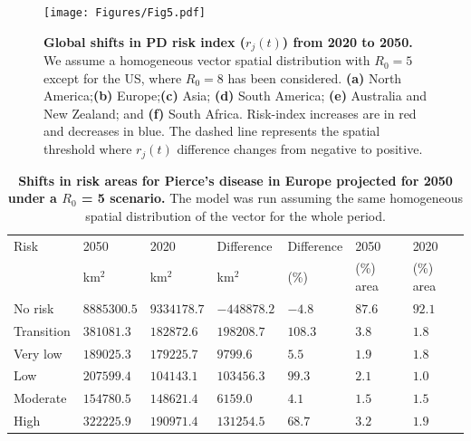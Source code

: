     \begin{figure}[H]
        \centering
        \texttt{[image: Figures/Fig5.pdf]}
        \caption[Global shifts in PD risk index ($r_j(t)$) from 2020 to
            2050]{\textbf{Global shifts in PD risk index ($r_j(t)$) from 2020
                to
                2050.} We assume a homogeneous vector spatial distribution with
            $R_0=5$ except for the US, where $R_0=8$ has been
            considered. \textbf{(a)} North America;\textbf{(b)}
            Europe;\textbf{(c)} Asia; \textbf{(d)} South America; \textbf{(e)}
            Australia
            and New Zealand; and \textbf{(f)} South Africa. Risk-index
            increases are in red
            and decreases in blue. The dashed line represents the spatial
            threshold where
            $r_j(t)$ difference changes from negative to positive.}
        \label{fig5}
    \end{figure}

    \begin{table}[H]
        \centering
        \caption[Extrapolated shifts in risk areas for Pierce's disease in
            Europe in 2050]{\textbf{Shifts in risk areas for Pierce's disease
                in Europe projected for 2050 under a $R_0$ = 5 scenario.} The
            model was run
            assuming the same
            homogeneous spatial distribution of the vector for the whole
            period.}
        \begin{tabular*}{\hsize}{@{\extracolsep{\fill}}lllllll}
            \hline
            Risk & 2050 & 2020 & Difference & Difference & 2050 & 2020 \\
            & km$^2$ & km$^2$ & km$^2$ & (\%) & (\%) area & (\%) area \\
            \hline
            No risk & $8885300.5$ & $9334178.7
            $ & $-448878.2
            $ & $-4.8
            $ & $87.6
            $ & $92.1
            $ \\
            Transition & $381081.3$
            & $182872.6$ & $198208.7$ & $108.3$ & $3.8$ & $1.8$ \\
            Very low & $189025.3$ & $179225.7
            $ & $9799.6$ & $5.5$ & $1.9$ & $1.8$ \\
            Low & $207599.4$ & $104143.1$ & $103456.3$ & $99.3$ & $2.1$ & $1.0$
            \\
            Moderate & $154780.5$ & $148621.4$ & $6159.0$ & $4.1$ & $1.5$ &
            $1.5$ \\
            High & $322225.9$ & $190971.4$ & $131254.5$ & $68.7$ & $3.2$ & $1.9
            $ \\
            \hline
        \end{tabular*}
        \label{table2}
    \end{table}

